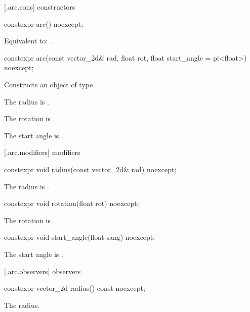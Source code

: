  [\iotwod.arc.cons] { constructors}

%
\begin{itemdecl}
constexpr arc() noexcept;
\end{itemdecl}
\begin{itemdescr}
\pnum
\effects
Equivalent to: .
\end{itemdescr}

%
\begin{itemdecl}
constexpr arc(const vector_2d& rad, float rot,
  float start_angle = pi<float>) noexcept;
\end{itemdecl}
\begin{itemdescr}
\pnum
\effects
Constructs an object of type .

\pnum
The radius is .

\pnum
The rotation is .

\pnum
The start angle is .
\end{itemdescr}

 [\iotwod.arc.modifiers]{ modifiers}

%
\begin{itemdecl}
constexpr void radius(const vector_2d& rad) noexcept;
\end{itemdecl}
\begin{itemdescr}
\pnum
\effects
The radius is .
\end{itemdescr}

%
\begin{itemdecl}
constexpr void rotation(float rot) noexcept;
\end{itemdecl}
\begin{itemdescr}
\pnum
\effects
The rotation is .
\end{itemdescr}

%
\begin{itemdecl}
constexpr void start_angle(float sang) noexcept;
\end{itemdecl}
\begin{itemdescr}
\pnum
\effects
The start angle is .
\end{itemdescr}

 [\iotwod.arc.observers]{ observers}

%
\begin{itemdecl}
constexpr vector_2d radius() const noexcept;
\end{itemdecl}
\begin{itemdescr}
\pnum
\returns
The radius.
\end{itemdescr}

